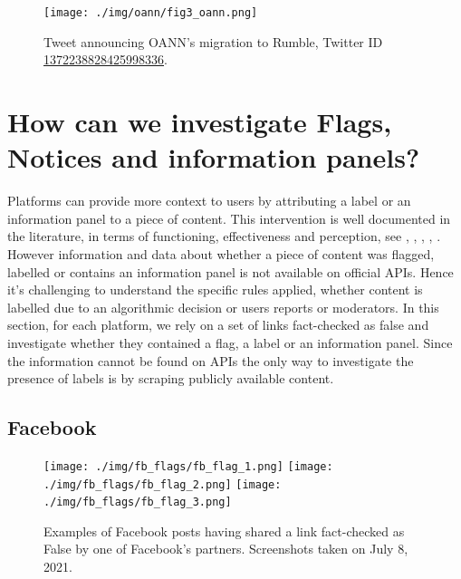 \documentclass[Afour,sageh,times]{sagej}
\begin{document}
\begin{figure}[h]
	\centering
		\texttt{[image: ./img/oann/fig3\_oann.png]}
		\caption{Tweet announcing OANN's migration to Rumble, Twitter ID \href{https://twitter.com/OANN/status/1372238828425998336}{1372238828425998336}.} 
	\label{tweets_about_yt_suspensions}
\end{figure}

\section{How can we investigate Flags, Notices and information panels?} \label{flags}

Platforms can provide more context to users by attributing a label or an information panel to a piece of content. This intervention is well documented in the literature, in terms of functioning, effectiveness and perception, see \cite{crawford2016flag}, \cite{morrow}, \cite{yaqub2020effects}, \cite{sharevski2021misinformation}, \cite{pennycook2020implied}. 
However information and data about whether a piece of content was flagged, labelled or contains an information panel is not available on official APIs. 
Hence it's challenging to understand the specific rules applied, whether content is labelled due to an algorithmic decision or users reports or moderators. 
In this section, for each platform, we rely on a set of links fact-checked as false and investigate whether they contained a flag, a label or an information panel. 
Since the information cannot be found on APIs the only way to investigate the presence of labels is by scraping publicly available content. 

\subsection{Facebook}

\begin{figure}[h]
\centering
\texttt{[image: ./img/fb\_flags/fb\_flag\_1.png]}
\texttt{[image: ./img/fb\_flags/fb\_flag\_2.png]}
\texttt{[image: ./img/fb\_flags/fb\_flag\_3.png]}
\caption{Examples of Facebook posts having shared a link fact-checked as False by one of Facebook’s partners. Screenshots taken on July 8, 2021.} 
\label{fb_flags}
\end{figure}
\end{document}
